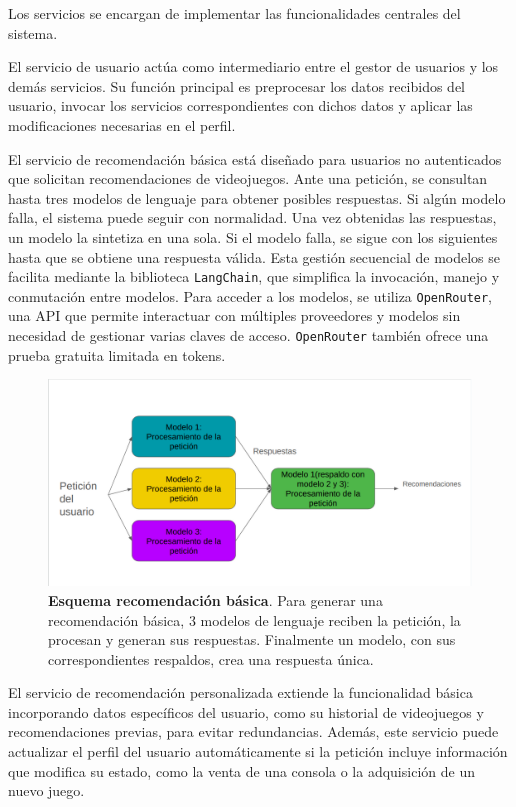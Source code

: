 Los servicios se encargan de implementar las funcionalidades centrales del sistema.

El servicio de usuario actúa como intermediario entre el gestor de usuarios y los demás servicios. Su función principal es preprocesar los datos recibidos del usuario, invocar los servicios correspondientes con dichos datos y aplicar las modificaciones necesarias en el perfil.

El servicio de recomendación básica está diseñado para usuarios no autenticados que solicitan recomendaciones de videojuegos. Ante una petición, se consultan hasta tres modelos de lenguaje para obtener posibles respuestas. Si algún modelo falla, el sistema puede seguir con normalidad. Una vez obtenidas las respuestas, un modelo la sintetiza en una sola. Si el modelo falla, se sigue con los siguientes hasta que se obtiene una respuesta válida. Esta gestión secuencial de modelos se facilita mediante la biblioteca \texttt{LangChain}, que simplifica la invocación, manejo y conmutación entre modelos. Para acceder a los modelos, se utiliza \texttt{OpenRouter}, una API que permite interactuar con múltiples proveedores y modelos sin necesidad de gestionar varias claves de acceso. \texttt{OpenRouter} también ofrece una prueba gratuita limitada en tokens.


\begin{figure}[H]
	\centering
	\includegraphics[width=1\linewidth]{imagenes/esquemaRecomendacionBasica.png}
	\caption[\textbf{Esquema recomendación básica}.]{\textbf{Esquema recomendación básica}. Para generar una recomendación básica, 3 modelos de lenguaje reciben la petición, la procesan y generan sus respuestas. Finalmente un modelo, con sus correspondientes respaldos, crea una respuesta única.}
	\label{esquemaRB}
\end{figure}


El servicio de recomendación personalizada extiende la funcionalidad básica incorporando datos específicos del usuario, como su historial de videojuegos y recomendaciones previas, para evitar redundancias. Además, este servicio puede actualizar el perfil del usuario automáticamente si la petición incluye información que modifica su estado, como la venta de una consola o la adquisición de un nuevo juego.

